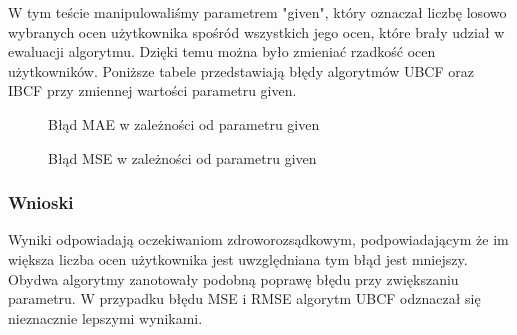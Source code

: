 \documentclass[12pt, a4paper]{article}
\begin{document}
W tym teście manipulowaliśmy parametrem "given", który oznaczał liczbę losowo wybranych ocen użytkownika spośród wszystkich jego ocen, które brały udział w ewaluacji algorytmu. Dzięki temu można było zmieniać rzadkość ocen użytkowników.
Poniższe tabele przedstawiają błędy algorytmów UBCF oraz IBCF przy zmiennej wartości parametru given.
\begin{figure}[H]
  \begin{center}
  \end{center}
  \caption{Błąd MAE w zależności od parametru given}
  \label{fig:given-mse}
\end{figure}

\begin{figure}[H]
  \begin{center}
  \end{center}
  \caption{Błąd MSE w zależności od parametru given}
  \label{fig:given-mse}
\end{figure}

\subsubsection{Wnioski}
Wyniki odpowiadają oczekiwaniom zdroworozsądkowym, podpowiadającym że im większa liczba ocen użytkownika jest uwzględniana tym błąd jest mniejszy.
Obydwa algorytmy zanotowały podobną poprawę błędu przy zwiększaniu parametru. W przypadku błędu MSE i RMSE algorytm UBCF odznaczał się nieznacznie lepszymi wynikami.
\end{document}
